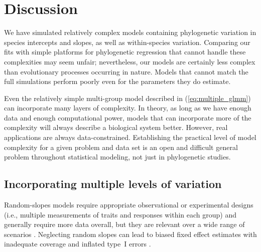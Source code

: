 \documentclass[12pt]{article}
\begin{document}
\section*{Discussion}

We have simulated relatively complex models containing phylogenetic variation in species intercepts and slopes, as well as within-species variation.
Comparing our fits with simple platforms for phylogenetic regression that cannot handle these complexities may seem unfair; nevertheless, our models are certainly less complex than evolutionary processes occurring in nature.
Models that cannot match the full simulations perform poorly even for the parameters they do estimate.

Even the relatively simple multi-group model described in (\ref{eq:multiple_glmm}) can incorporate many layers of complexity.
In theory, as long as we have enough data and enough computational power, models that can incorporate more of the complexity will always describe a biological system better.
However, real applications are always data-constrained.
Establishing the practical level of model complexity for a given problem and data set is an open and difficult general problem throughout statistical modeling, not just in phylogenetic studies.

\subsection*{Incorporating multiple levels of variation}

Random-slopes models require appropriate observational or experimental designs (i.e., multiple measurements of traits and responses within each group) and generally require more data overall, but they are relevant over a wide range of scenarios \citep{schielzeth2008conclusions, cleasby2015quantifying,ord2010adaptation}.
Neglecting random slopes can lead to biased fixed effect estimates with inadequate coverage and inflated type~I errors \citep{schielzeth2008conclusions}.
\end{document}
